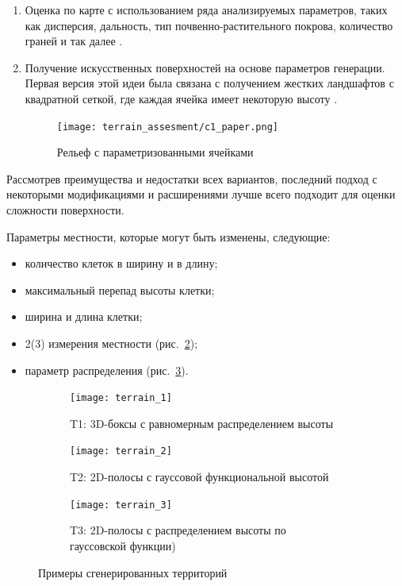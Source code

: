 \begin{enumerate}
    \item Оценка по карте с использованием ряда анализируемых параметров, таких как дисперсия, дальность, тип почвенно-растительного покрова, количество граней и так далее \cite{hung_Advanced_2004}.
    \item Получение искусственных поверхностей на основе параметров генерации. Первая версия этой идеи была связана с получением жестких ландшафтов с квадратной сеткой, где каждая ячейка имеет некоторую высоту \cite{sancho-pradel_Survey_2010} .
          
          \begin{figure}[H]
              \centering\texttt{[image: terrain\_assesment/c1\_paper.png]}
              \caption{Рельеф с параметризованными ячейками}
              \label{fig:terrain_assesment/c1_paper.png}
          \end{figure}
\end{enumerate}

Рассмотрев преимущества и недостатки всех вариантов, последний подход с некоторыми модификациями и расширениями лучше всего подходит для оценки сложности поверхности.

Параметры местности, которые могут быть изменены, следующие:
\begin{itemize}
\item количество клеток в ширину и в длину;
\item максимальный перепад высоты клетки;
\item ширина и длина клетки;
\item 2(3) измерения местности (рис.~\ref{fig:terrain_1});
\item параметр распределения (рис.~\ref{fig:terrain_2}).
\end{itemize}

\begin{figure}[H]
    \begin{subfigure}{0.33\textwidth}
    \centering\texttt{[image: terrain\_1]} 
    \caption{T1: 3D-боксы с равномерным распределением высоты}
    \label{fig:terrain_1}
    \end{subfigure}
    \begin{subfigure}{0.33\textwidth}
    \centering\texttt{[image: terrain\_2]} 
    \caption{T2: 2D-полосы с гауссовой функциональной высотой}
    \label{fig:terrain_2}
    \end{subfigure}
    \begin{subfigure}{0.33\textwidth}
    \centering\texttt{[image: terrain\_3]}
    \caption{T3: 2D-полосы с распределением высоты по гауссовской функции)}
    \label{fig:terrain_3}
    \end{subfigure}
     
    \caption{Примеры сгенерированных территорий}
    \label{fig:terrains}
\end{figure}


